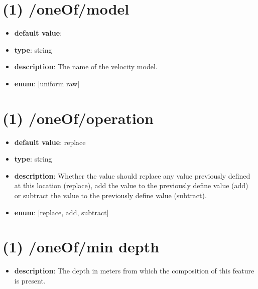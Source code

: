 \section{(1) /oneOf/model}
\begin{itemize}[leftmargin=1em]\item {\bf default value}: 
\item {\bf type}: string
\item {\bf description}: The name of the velocity model.
\item {\bf enum}: [uniform raw]\end{itemize}\section{(1) /oneOf/operation}
\begin{itemize}[leftmargin=1em]\item {\bf default value}: replace
\item {\bf type}: string
\item {\bf description}: Whether the value should replace any value previously defined at this location (replace), add the value to the previously define value (add) or subtract the value to the previously define value (subtract).
\item {\bf enum}: [replace, add, subtract]\end{itemize}\section{(1) /oneOf/min depth}
\begin{itemize}[leftmargin=1em]\item {\bf description}: The depth in meters from which the composition of this feature is present.
\end{itemize}
